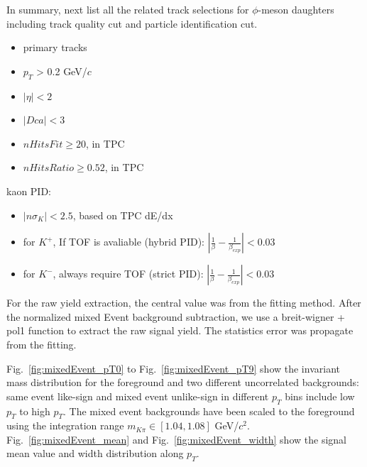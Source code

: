 In summary, next list all the related track selections for $\phi$-meson daughters including track quality cut and particle identification cut.
\begin{itemize}
\item primary tracks
\item $p_{T}$ > 0.2 GeV/$c$
\item $|\eta| < 2$
\item $|Dca| < 3$
\item $nHitsFit \ge 20$, in TPC
\item $nHitsRatio \ge 0.52$, in TPC
\end{itemize}

kaon PID:
\begin{itemize}
  \item $|n\sigma_{K}| < 2.5 $, based on TPC dE/dx
  \item for $K^{+}$, If TOF is avaliable (hybrid PID):  $|\frac{1}{\beta}-\frac{1}{\beta_{exp}}|<0.03$
  \item for $K^{-}$, always require TOF (strict PID):  $|\frac{1}{\beta}-\frac{1}{\beta_{exp}}|<0.03$
\end{itemize}


For the raw yield extraction, the central value was from the fitting method. After the normalized mixed Event background subtraction, we use a breit-wigner + pol1 function to extract the raw signal yield. The statistics error was propagate from the fitting. 

Fig.~\ref{fig:mixedEvent_pT0} to Fig.~\ref{fig:mixedEvent_pT9} show the invariant mass distribution for the foreground and two different uncorrelated backgrounds: same event like-sign and mixed event unlike-sign in different $p_T$ bins include low $p_T$ to high $p_T$. The mixed event backgrounds have been scaled to the foreground using the integration range $m_{K\pi}\in[1.04,1.08]$ GeV/$c^{2}$. Fig.~\ref{fig:mixedEvent_mean} and Fig.~\ref{fig:mixedEvent_width} show the signal mean value and width distribution along $p_T$. 

